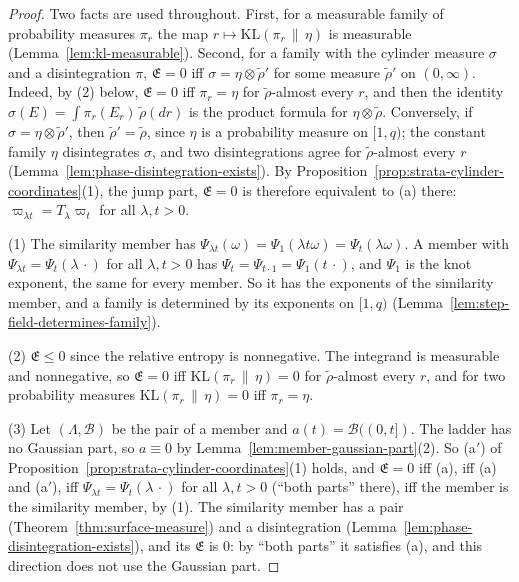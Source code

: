 \begin{proof}
\leanok
{}
Two facts are used throughout. First, for a measurable family of probability measures $\pi_r$ the
map $r \mapsto \mathrm{KL}(\pi_r \,\|\, \eta)$ is measurable (Lemma~\ref{lem:kl-measurable}).
Second, for a family with the
cylinder measure $\sigma$ and a disintegration $\pi$, $\mathfrak{E} = 0$ iff
$\sigma = \eta \otimes \tilde\rho'$ for some measure $\tilde\rho'$ on $(0,\infty)$. Indeed, by (2)
below, $\mathfrak{E} = 0$ iff $\pi_r = \eta$ for $\tilde\rho$-almost every $r$, and then the identity
$\sigma(E) = \int\pi_r(E_r)\,\tilde\rho(dr)$ is the product formula for $\eta \otimes \tilde\rho$.
Conversely, if $\sigma = \eta \otimes \tilde\rho'$, then $\tilde\rho' = \tilde\rho$, since $\eta$ is a
probability measure on $[1,q)$; the constant family $\eta$ disintegrates $\sigma$, and two
disintegrations agree for $\tilde\rho$-almost every $r$
(Lemma~\ref{lem:phase-disintegration-exists}). By
Proposition~\ref{prop:strata-cylinder-coordinates}(1), the jump part, $\mathfrak{E} = 0$ is therefore
equivalent to (a) there: $\varpi_{\lambda t} = T_\lambda\varpi_t$ for all $\lambda, t > 0$.

(1) The similarity member has $\Psi_{\lambda t}(\omega) = \Psi_1(\lambda t\omega) = \Psi_t(\lambda\omega)$.
A member with $\Psi_{\lambda t} = \Psi_t(\lambda\,\cdot)$ for all $\lambda, t > 0$ has
$\Psi_t = \Psi_{t\cdot1} = \Psi_1(t\,\cdot)$, and $\Psi_1$ is the knot exponent, the same for every
member. So it has the exponents of the similarity member, and a family is determined by its
exponents on $[1,q)$ (Lemma~\ref{lem:step-field-determines-family}).

(2) $\mathfrak{E} \le 0$ since the relative entropy is nonnegative. The integrand is measurable and
nonnegative, so $\mathfrak{E} = 0$ iff $\mathrm{KL}(\pi_r \,\|\, \eta) = 0$ for $\tilde\rho$-almost
every $r$, and for two probability measures $\mathrm{KL}(\pi_r \,\|\, \eta) = 0$ iff $\pi_r = \eta$.

(3) Let $(\Lambda, \mathcal{B})$ be the pair of a member and $a(t) = \mathcal{B}((0,t])$. The
ladder has no Gaussian part, so $a \equiv 0$ by Lemma~\ref{lem:member-gaussian-part}(2). So (a$'$) of
Proposition~\ref{prop:strata-cylinder-coordinates}(1) holds, and $\mathfrak{E} = 0$ iff (a), iff (a)
and (a$'$), iff $\Psi_{\lambda t} = \Psi_t(\lambda\,\cdot)$ for all $\lambda, t > 0$ (``both parts''
there), iff the member is the similarity member, by (1). The similarity member has a pair
(Theorem~\ref{thm:surface-measure}) and a disintegration
(Lemma~\ref{lem:phase-disintegration-exists}), and its $\mathfrak{E}$ is $0$: by ``both parts'' it
satisfies (a), and this direction does not use the Gaussian part.


\end{proof}
